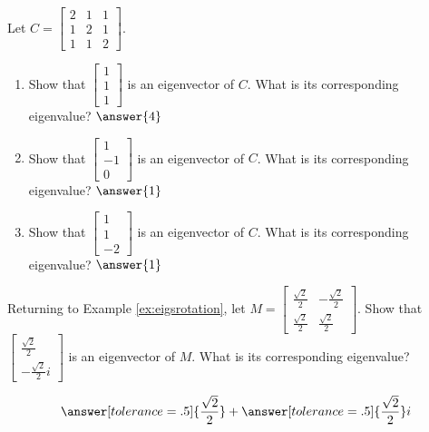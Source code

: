 \documentclass{ximera}
\author{Zack Reed}
\begin{document}
\begin{problem}

Let $C=\begin{bmatrix} 2 & 1 & 1\\ 1 & 2 & 1\\ 1 & 1 & 2\end{bmatrix}$.

\begin{enumerate}
    
\item Show that $\begin{bmatrix} 1\\1\\1 \end{bmatrix}$ is an eigenvector of $C$.  What is its corresponding eigenvalue?
$\answer{4}$

    
\item Show that $\begin{bmatrix} 1\\-1\\0 \end{bmatrix}$ is an eigenvector of $C$.  What is its corresponding eigenvalue?
$\answer{1}$

    
\item Show that $\begin{bmatrix} 1\\1\\-2 \end{bmatrix}$ is an eigenvector of $C$.  What is its corresponding eigenvalue?
$\answer{1}$
\end{enumerate}
\end{problem}
    
    
    
    
\begin{problem}\label{ex:eigsrotation2}
Returning to Example \ref{ex:eigsrotation}, let $M=\begin{bmatrix}
\frac{\sqrt{2}}{2} & -\frac{\sqrt{2}}{2}\\
\frac{\sqrt{2}}{2} & \frac{\sqrt{2}}{2}
\end{bmatrix}$.  Show that $\begin{bmatrix} \frac{\sqrt{2}}{2}\\ -\frac{\sqrt{2}}{2} i \end{bmatrix}$ is an eigenvector of $M$.  What is its corresponding eigenvalue?
    
$$\answer[tolerance=.5]{\frac{\sqrt{2}}{2}}+\answer[tolerance=.5]{\frac{\sqrt{2}}{2}}i$$
\end{problem}
    
\end{document}
